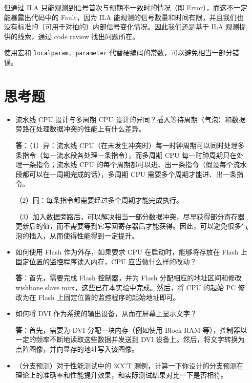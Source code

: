 \documentclass[12pt,a4paper,oneside]{ctexart}
\begin{document}
但通过 ILA 只能观测到信号首次与预期不一致时的情况（即 Error），而这不一定能暴露出代码中的 Fault，因为 ILA 能观测的信号数量和时间有限，并且我们也没有标准的（可用于对拍的）内部信号变化情况。因此我们还是基于 ILA 观测提供的线索，通过 code review 找出问题所在。

使用宏和 \texttt{localparam, parameter} 代替硬编码的常数，可以避免相当一部分错误。

\section{思考题}

\begin{itemize}
    \item 流水线 CPU 设计与多周期 CPU 设计的异同？插入等待周期（气泡）和数据旁路在处理数据冲突的性能上有什么差异。
    
    \textbf{答}：（1）异：流水线 CPU（在未发生冲突时）每一时钟周期可以同时处理多条指令（每一流水段各处理一条指令），而多周期 CPU 每一时钟周期只在处理一条指令；流水线 CPU 的每个周期都可以进、出一条指令（假设每个流水段都可以在一周期完成的话），多周期 CPU 需要多个周期才能进、出一条指令。
    
    （2）同：每条指令都需要经过多个周期才能完成执行。

    （3）加入数据旁路后，可以解决相当一部分数据冲突，尽早获得部分寄存器更新后的值，而不需要等到它写回寄存器后才能获得。因此，可以避免很多气泡的插入，从而使得性能得到一定提升。
    
    \item 如何使用 Flash 作为外存，如果要求 CPU 在启动时，能够将存放在 Flash 上固定位置的监控程序读入内存，CPU 应当做什么样的改动？
    
    \textbf{答}：首先，需要完成 Flash 控制器，并为 Flash 分配相应的地址区间和修改 wishbone slave mux，这些已在本实验中完成。然后，将 CPU 的起始 PC 修改为在 Flash 上固定位置的监控程序的起始地址即可。
    
    \item 如何将 DVI 作为系统的输出设备，从而在屏幕上显示文字？
    
    \textbf{答}：首先，需要为 DVI 分配一块内存（例如使用 Block RAM 等），控制器以一定的频率不断地读取这些数据并发送到  DVI 设备上。然后，将文字转换为点阵图像，并向显存的地址写入该图像。
    
    \item （分支预测）对于性能测试中的 3CCT 测例，计算一下你设计的分支预测在理论上的准确率和性能提升效果，和实际测试结果对比一下是否相符。
    

\end{itemize}
\end{document}
